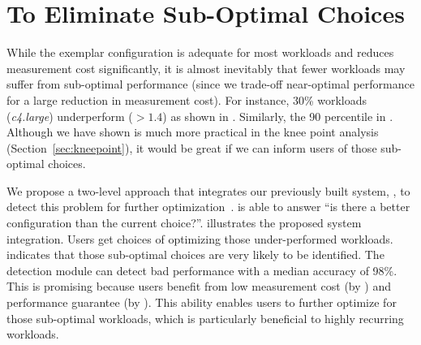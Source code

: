 \section{To Eliminate Sub-Optimal Choices}
\label{sec:system}

While the exemplar configuration is adequate for most workloads and reduces measurement cost significantly, it is almost inevitably that fewer workloads may suffer from sub-optimal performance (since we trade-off near-optimal performance for a large reduction in measurement cost).
For instance, 30\% workloads (\textit{c4.large}) underperform ($> 1.4$) as shown in \mytable{\ref{table:top3}}.
Similarly, the 90 percentile in \myfigure{\ref{fig:s2_cost_performance}}.
Although we have shown \micky is much more practical in the knee point analysis (Section~\ref{sec:kneepoint}),
it would be great if we can inform users of those sub-optimal choices.


We propose a two-level approach that integrates our previously built system, \scout, to detect this problem for further optimization~\cite{Hsu2018Scout}.
\scout is able to answer ``is there a better configuration than the current choice?''.
\myfigure{\ref{fig:system_design}} illustrates the proposed system integration.
Users get choices of optimizing those under-performed workloads.
\myfigure{\ref{fig:detection_misprediction}} indicates that those sub-optimal choices are very likely to be identified.
The detection module can detect bad performance with a median accuracy of 98\%.
This is promising because users benefit from
low measurement cost (by \micky) and
performance guarantee (by \scout).
This ability enables users to further optimize for those sub-optimal workloads, which is particularly beneficial to highly recurring workloads.